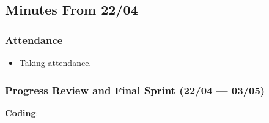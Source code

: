 \documentclass[12pt]{article}
\begin{document}
\hypertarget{minutes-from-2204}{%
\subsection{Minutes From 22/04}\label{minutes-from-2204}}

\hypertarget{attendance-5}{%
\subsubsection{Attendance}\label{attendance-5}}

\begin{itemize}
\tightlist
\item
  Taking attendance.
\end{itemize}

\hypertarget{progress-review-and-final-sprint-2204-0305}{%
\subsubsection{Progress Review and Final Sprint (22/04 ---
03/05)}\label{progress-review-and-final-sprint-2204-0305}}

\textbf{Coding}:
\end{document}
